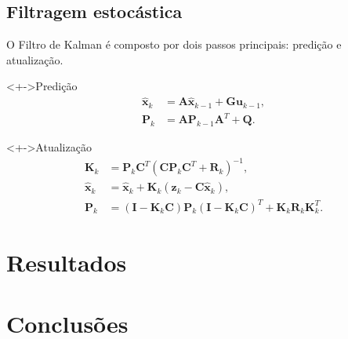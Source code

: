 \documentclass[%
  10pt,%
  aspectratio = 43,%
  compress,%
  t,%
  english,%
  brazilian,%
]{beamer}
\begin{document}
\subsection{Filtragem estocástica}\label{ssec:filtragem}

\begin{frame}
O Filtro de Kalman é composto por dois passos principais: predição e atualização. 
\begin{block}<+->{Predição}
\begin{align}
\hat{\mathbf{x}}_{k} &= \mathbf{A}\hat{\mathbf{x}}_{k-1} + \mathbf{G}\mathbf{u}_{k-1},\label{KF_begin}\\
	\mathbf{P}_{k} &= \mathbf{A}\mathbf{P}_{k-1}\mathbf{A}^{T}+\mathbf{Q}.
\end{align}
\end{block}
\begin{block}<+->{Atualização}
\begin{align}
	\mathbf{K}_{k} &= \mathbf{P}_{k}\mathbf{C}^{T}(\mathbf{C}\mathbf{P}_{k}\mathbf{C}^{T}+\mathbf{R}_{k})^{-1}, \\
	\hat{\mathbf{x}}_{k} &= \hat{\mathbf{x}}_{k}+\mathbf{K}_{k}(\mathbf{z}_{k}-\mathbf{C}\hat{\mathbf{x}}_{k}), \\
	\mathbf{P}_{k} &= (\mathbf{I} - \mathbf{K}_{k}\mathbf{C})\mathbf{P}_{k}(\mathbf{I} - \mathbf{K}_{k}\mathbf{C})^{T}+\mathbf{K}_{k}\mathbf{R}_{k}\mathbf{K}_{k}^{T}.\label{KF_end}
\end{align}
\end{block}
\end{frame}


\section{Resultados}\label{sec:revisao}
\subsection{}\label{ssec:modelos}

\begin{frame}
\end{frame}


\section{Conclusões}\label{sec:revisao}
\end{document}
